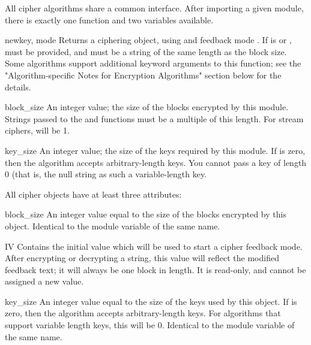 \documentclass{howto}
\begin{document}
All cipher algorithms share a common interface.  After importing a
given module, there is exactly one function and two variables
available.

\begin{funcdesc}{new}{key, mode}
Returns a ciphering object, using  and feedback mode
.  If  is  or ,  must be provided,
and must be a string of the same length as the block size.  Some
algorithms support additional keyword arguments to this function; see
the "Algorithm-specific Notes for Encryption Algorithms" section below for the details.
\end{funcdesc}

\begin{datadesc}{block_size}
An integer value; the size of the blocks encrypted by this module.
Strings passed to the  and  functions
must be a multiple of this length.  For stream ciphers,
 will be 1.
\end{datadesc}

\begin{datadesc}{key_size}
An integer value; the size of the keys required by this module.  If
 is zero, then the algorithm accepts arbitrary-length
keys.  You cannot pass a key of length 0 (that is, the null string
 as such a variable-length key.
\end{datadesc}

All cipher objects have at least three attributes:

\begin{memberdesc}{block_size}
An integer value equal to the size of the blocks encrypted by this object.
Identical to the module variable of the same name.
\end{memberdesc}

\begin{memberdesc}{IV}
Contains the initial value which will be used to start a cipher
feedback mode.  After encrypting or decrypting a string, this value
will reflect the modified feedback text; it will always be one block
in length.  It is read-only, and cannot be assigned a new value.
\end{memberdesc}

\begin{memberdesc}{key_size}
An integer value equal to the size of the keys used by this object.  If
 is zero, then the algorithm accepts arbitrary-length
keys.  For algorithms that support variable length keys, this will be 0.
Identical to the module variable of the same name.
\end{memberdesc}
\end{document}
